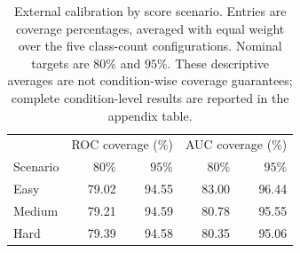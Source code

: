 \begin{table}[t]
\centering
\caption{External calibration by score scenario. Entries are coverage percentages, averaged with equal weight over the five class-count configurations. Nominal targets are $80\%$ and $95\%$. These descriptive averages are not condition-wise coverage guarantees; complete condition-level results are reported in the appendix table.}
\label{tab:class-counts-calibration-by-scenario}
\begingroup
\small
\setlength{\tabcolsep}{6pt}
\renewcommand{\arraystretch}{1.12}
\begin{tabular}{@{}lrrrr@{}}
\hline
 & \multicolumn{2}{c}{ROC coverage (\%)} & \multicolumn{2}{c}{AUC coverage (\%)} \\ 
Scenario & $80\%$ & $95\%$ & $80\%$ & $95\%$ \\
\hline
Easy & 79.02 & 94.55 & 83.00 & 96.44 \\
Medium & 79.21 & 94.59 & 80.78 & 95.55 \\
Hard & 79.39 & 94.58 & 80.35 & 95.06 \\
\hline
\end{tabular}
\endgroup
\end{table}
